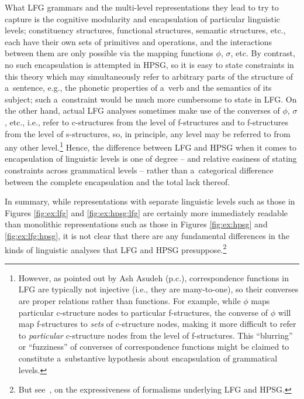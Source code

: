 \documentclass[output=paper,hidelinks]{langscibook}
\begin{document}
\largerpage
What LFG grammars and the multi-level representations they lead to try to capture is the cognitive modularity and encapsulation of particular linguistic levels; constituency structures, functional structures, semantic structures, etc., each have their own sets of primitives and operations, and the interactions between them are only possible via the mapping functions $\phi$, $\sigma$, etc.  By contrast, no such encapsulation is attempted in HPSG, so it is easy to state constraints in this theory which may simultaneously refer to arbitrary parts of the structure of a~sentence, e.g., the phonetic properties of a~verb and the semantics of its subject; such a~constraint would be much more cumbersome to state in LFG\@.  On the other hand, actual LFG analyses sometimes make use of the converses of $\phi$, $\sigma$, etc., i.e., refer to c-structures from the level of f-structures and to f-structures from the level of s-structures, so, in principle, any level may be referred to from any other level.\footnote{However, as pointed out by Ash Asudeh (p.c.), correspondence functions in LFG are typically not injective (i.e., they are many-to-one), so their converses are proper relations rather than functions.  For example, while $\phi$ maps particular c-structure nodes to particular f-structures, the converse of $\phi$ will map f-structures to \emph{sets} of c-structure nodes, making it more difficult to refer to \emph{particular} c-structure nodes from the level of f-structures.  This “blurring” or “fuzziness” of converses of correspondence functions might be claimed to constitute a~substantive hypothesis about encapsulation of grammatical levels.}  Hence, the difference between LFG and HPSG when it comes to encapsulation of linguistic levels is one of degree -- and relative easiness of stating constraints across grammatical levels -- rather than a~categorical difference between the complete encapsulation and the total lack thereof.

\largerpage

In summary, while representations with separate linguistic levels such as those in Figures \ref{fig:ex:lfg} and \ref{fig:ex:hpsg:lfg} are certainly more immediately readable than monolithic representations such as those in Figures \ref{fig:ex:hpsg} and \ref{fig:ex:lfg:hpsg}, it is not clear that there are any fundamental differences in the kinds of linguistic analyses that LFG and HPSG presuppose.\footnote{But see~, on the expressiveness of formalisms underlying LFG and HPSG\@.}
\end{document}

